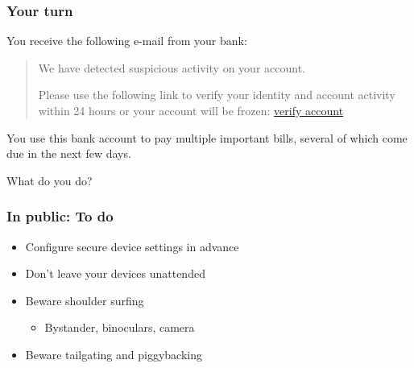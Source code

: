 \documentclass[blue]{beamer}
\begin{document}
\begin{frame}
\frametitle{Your turn}

You receive the following e-mail from your bank:

\begin{quote}
We have detected suspicious activity on your account.

Please use the following link to verify your identity and account activity within 24 hours or your account will be frozen: \href{foo}{verify account}
\end{quote}

You use this bank account to pay multiple important bills, several of which come due in the next few days.

\begin{block}{What do you do?}
\end{block}

\end{frame}


\begin{frame}
\frametitle{In public: To do}

\begin{itemize}
  \item Configure secure device settings in advance
  \item Don't leave your devices unattended
  \item Beware shoulder surfing
  \begin{itemize}
    \item Bystander, binoculars, camera
  \end{itemize}
  \item Beware tailgating and piggybacking
\end{itemize}

\end{frame}
\end{document}
